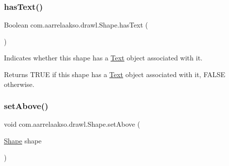 \subsubsection{\texorpdfstring{has\+Text()}{hasText()}}
{\footnotesize\ttfamily Boolean com.\+aarrelaakso.\+drawl.\+Shape.\+has\+Text (\begin{DoxyParamCaption}{ }\end{DoxyParamCaption})\hspace{0.3cm}{\ttfamily [inherited]}}



Indicates whether this shape has a \hyperlink{classcom_1_1aarrelaakso_1_1drawl_1_1_text}{Text} object associated with it. 

\begin{DoxyReturn}{Returns}
T\+R\+UE if this shape has a \hyperlink{classcom_1_1aarrelaakso_1_1drawl_1_1_text}{Text} object associated with it, F\+A\+L\+SE otherwise. 
\end{DoxyReturn}
\mbox{\label{classcom_1_1aarrelaakso_1_1drawl_1_1_shape_a942b3cf3365498dc1ac6b0309ce33b86}} 
\subsubsection{\texorpdfstring{set\+Above()}{setAbove()}\hspace{0.1cm}{\footnotesize\ttfamily [1/2]}}
{\footnotesize\ttfamily void com.\+aarrelaakso.\+drawl.\+Shape.\+set\+Above (\begin{DoxyParamCaption}\item[{\hyperlink{classcom_1_1aarrelaakso_1_1drawl_1_1_shape}{Shape}}]{shape }\end{DoxyParamCaption})\hspace{0.3cm}{\ttfamily [inherited]}}

\mbox{\label{classcom_1_1aarrelaakso_1_1drawl_1_1_shape_aab165a65f7bd1e55a6de7166577725a3}} 
